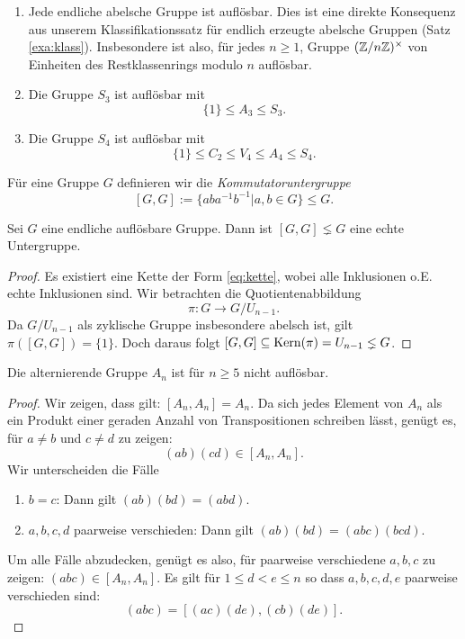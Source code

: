 \documentclass{book}
\begin{document}
\begin{exas}
    \label{exas:auflösbar}
    \begin{enumerate}
        \item Jede endliche abelsche Gruppe ist auflösbar. Dies ist eine
            direkte Konsequenz aus unserem Klassifikationssatz für endlich
            erzeugte abelsche Gruppen (Satz \ref{exa:klass}). Insbesondere ist
            also, für jedes $n \ge 1$, Gruppe $(\mathbb{Z}/n\mathbb{Z})^{\times}$ von
            Einheiten des Restklassenrings modulo $n$ auflösbar. 
        \item Die Gruppe $S_3$ ist auflösbar mit
            \[
                \{1\} \le A_3 \le S_3.
            \]
        \item Die Gruppe $S_4$ ist auflösbar mit
            \[
                \{1\} \le C_2 \le V_4 \le A_4 \le S_4.
            \]
    \end{enumerate}
\end{exas}

Für eine Gruppe $G$ definieren wir die {\em Kommutatoruntergruppe}
\[
    [G,G] := \{aba^{-1}b^{-1} | a,b \in G\} \le G. 
\]

\begin{lem}
    \label{lem:auf}
    Sei $G$ eine endliche auflösbare Gruppe. Dann ist $[G,G] \lneq G$ eine
    echte Untergruppe. 
\end{lem}
\begin{proof}
    Es existiert eine Kette der Form \eqref{eq:kette}, wobei alle Inklusionen
    o.E. echte Inklusionen sind. Wir betrachten die Quotientenabbildung
    \[
        \pi: G \to G/U_{n-1}.
    \]
    Da $G/U_{n-1}$ als zyklische Gruppe insbesondere abelsch ist, gilt $\pi([G,G])
    = \{1\}$. Doch daraus folgt $[G,G] \subseteq \operatorname{Kern}(\pi) = U_{n-1} \lneq G$. 
\end{proof}

\begin{thm}
    \label{thm:annot}
    Die alternierende Gruppe $A_n$ ist für $n \ge 5$ nicht auflösbar. 
\end{thm}
\begin{proof}
    Wir zeigen, dass gilt: $[A_n,A_n] = A_n$. Da sich jedes Element von $A_n$
    als ein Produkt einer geraden Anzahl von Transpositionen schreiben lässt,
    genügt es, für $a \neq b$ und $c \neq d$ zu zeigen:
    \[
        (ab)(cd) \in [A_n,A_n].
    \]
    Wir unterscheiden die Fälle
    \begin{enumerate}[label= \arabic *.]
        \item $b = c$: Dann gilt $(ab)(bd) = (abd)$. 
        \item $a,b,c,d$ paarweise verschieden: Dann gilt $(ab)(bd) = (abc)(bcd)$. 
    \end{enumerate}
    Um alle Fälle abzudecken, genügt es also, für paarweise verschiedene $a,b,c$
    zu zeigen: $(abc) \in [A_n,A_n]$. Es gilt für $1 \le d < e \le n$ so dass
    $a,b,c,d,e$ paarweise verschieden sind: 
    \[
        (abc) = [(ac)(de),(cb)(de)].
    \]
\end{proof}
\end{document}
